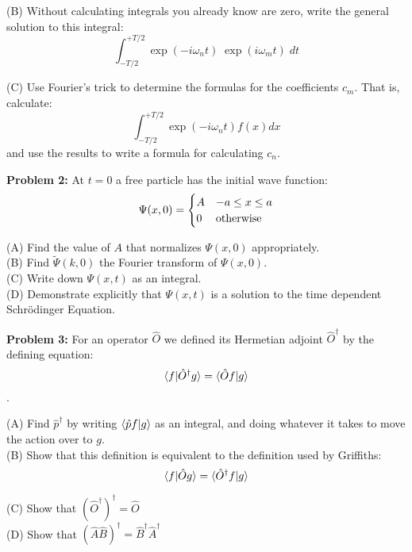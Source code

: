 \documentclass[12pt]{article}
\begin{document}
\noindent
(B) Without calculating integrals you already know are zero, write the general solution to this integral:
$$ \int_{-T/2}^{+T/2} \exp(-i \omega_n t) \; \exp(i \omega_m t)  \; dt $$

\noindent
(C) Use Fourier's trick to determine the formulas for the coefficients $c_m$.  That is, calculate:
$$ \int_{-T/2}^{+T/2} \exp(-i \omega_n t) f(x) dx $$
and use the results to write a formula for calculating $c_n$.

\newpage

\noindent
{\bf Problem 2:} At $t=0$ a free particle has the initial wave function:
$$ \Psi(x,0) = 
\begin{cases}    
A & -a \leq x \leq a \\
0 & {\rm otherwise} \\
\end{cases} 
$$

\noindent
(A) Find the value of $A$ that normalizes $\Psi(x,0)$ appropriately.\\

\noindent
(B) Find $\widetilde{\Psi}(k,0)$ the Fourier transform of $\Psi(x,0)$.\\

\noindent
(C) Write down $\Psi(x,t)$ as an integral.\\

\noindent
(D) Demonstrate explicitly that $\Psi(x,t)$ is a solution to the time dependent Schr\"odinger Equation.\\

\vskip 2cm

\noindent
{\bf Problem 3:} For an operator $\hat{O}$ we defined its Hermetian adjoint $\hat{O}^\dagger$ by the defining equation:
$$\braket{f|\hat{O}^\dagger g} = \braket{\hat{O} f | g}$$.

\noindent
(A) Find $\hat{p}^\dagger$ by writing $\braket{\hat{p} f | g}$ as an integral, and doing whatever it takes to move the action over to $g$.\\[5pt]

\noindent
(B) Show that this definition is equivalent to the definition used by Griffiths:
$$\braket{f|\hat{O} g} = \braket{\hat{O}^\dagger f | g}$$

\noindent
(C) Show that $\left(\hat{O}^\dagger\right)^\dagger = \hat{O}$\\[5pt]

\noindent
(D) Show that $\left(\hat{A}\hat{B}\right)^\dagger = \hat{B}^\dagger\hat{A}^\dagger$\\[5pt]
\end{document}
